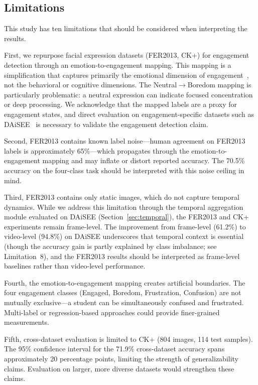 \documentclass[sensors,article,submit,pdftex,moreauthors]{Definitions/mdpi}
\begin{document}
\subsection{Limitations}

This study has ten limitations that should be considered when interpreting the results.

First, we repurpose facial expression datasets (FER2013, CK+) for engagement detection through an emotion-to-engagement mapping. This mapping is a simplification that captures primarily the emotional dimension of engagement~\cite{fredricks2004school}, not the behavioral or cognitive dimensions. The Neutral$\rightarrow$Boredom mapping is particularly problematic: a neutral expression can indicate focused concentration or deep processing. We acknowledge that the mapped labels are a proxy for engagement states, and direct evaluation on engagement-specific datasets such as DAiSEE~\cite{solanki2022engagement} is necessary to validate the engagement detection claim.

Second, FER2013 contains known label noise---human agreement on FER2013 labels is approximately 65\%---which propagates through the emotion-to-engagement mapping and may inflate or distort reported accuracy. The 70.5\% accuracy on the four-class task should be interpreted with this noise ceiling in mind.

Third, FER2013 contains only static images, which do not capture temporal dynamics. While we address this limitation through the temporal aggregation module evaluated on DAiSEE (Section~\ref{sec:temporal}), the FER2013 and CK+ experiments remain frame-level. The improvement from frame-level (61.2\%) to video-level (94.8\%) on DAiSEE underscores that temporal context is essential (though the accuracy gain is partly explained by class imbalance; see Limitation~8), and the FER2013 results should be interpreted as frame-level baselines rather than video-level performance.

Fourth, the emotion-to-engagement mapping creates artificial boundaries. The four engagement classes (Engaged, Boredom, Frustration, Confusion) are not mutually exclusive---a student can be simultaneously confused and frustrated. Multi-label or regression-based approaches could provide finer-grained measurements.

Fifth, cross-dataset evaluation is limited to CK+ (804 images, 114 test samples). The 95\% confidence interval for the 71.9\% cross-dataset accuracy spans approximately 20 percentage points, limiting the strength of generalizability claims. Evaluation on larger, more diverse datasets would strengthen these claims.
\end{document}
